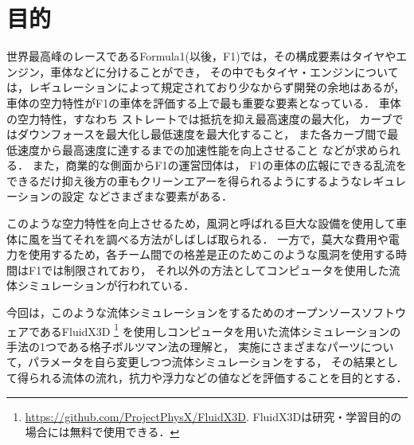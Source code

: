\documentclass[main]{subfiles}
\begin{document}
\chapter{目的}

世界最高峰のレースであるFormula1(以後，F1)では，その構成要素はタイヤやエンジン，車体などに分けることができ，
その中でもタイヤ・エンジンについては，レギュレーションによって規定されており少なからず開発の余地はあるが，車体の空力特性がF1の車体を評価する上で最も重要な要素となっている．\cite{ref:f1-wind-tunnel}
車体の空力特性，すなわち
ストレートでは抵抗を抑え最高速度の最大化，
カーブではダウンフォースを最大化し最低速度を最大化すること，
また各カーブ間で最低速度から最高速度に達するまでの加速性能を向上させること
などが求められる．
また，商業的な側面からF1の運営団体は，
F1の車体の広報にできる乱流をできるだけ抑え後方の車もクリーンエアーを得られるようにするようなレギュレーションの設定
などさまざまな要素がある．

このような空力特性を向上させるため，風洞と呼ばれる巨大な設備を使用して車体に風を当てそれを調べる方法がしばしば取られる．
一方で，莫大な費用や電力を使用するため，各チーム間での格差是正のためこのような風洞を使用する時間はF1では制限されており\cite{ref:f1-sporting-regulations}，
それ以外の方法としてコンピュータを使用した流体シミュレーションが行われている．

今回は，このような流体シミュレーションをするためのオープンソースソフトウェアであるFluidX3D
\footnote{
    \url{https://github.com/ProjectPhysX/FluidX3D}.
    FluidX3Dは研究・学習目的の場合には無料で使用できる．
}
を使用しコンピュータを用いた流体シミュレーションの手法の1つである格子ボルツマン法の理解と，
実施にさまざまなパーツについて，パラメータを自ら変更しつつ流体シミュレーションをする，
その結果として得られる流体の流れ，抗力や浮力などの値などを評価することを目的とする．
\end{document}
